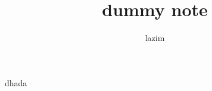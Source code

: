 \documentclass[a4paper, 11pt]{article}
\title{\vspace{-3em}\bfseries dummy note\vspace{-1em}}
\author{lazim}
\begin{document}
\maketitle

\begin{theorem}[dummy]
    dhada
\end{theorem}
\end{document}
